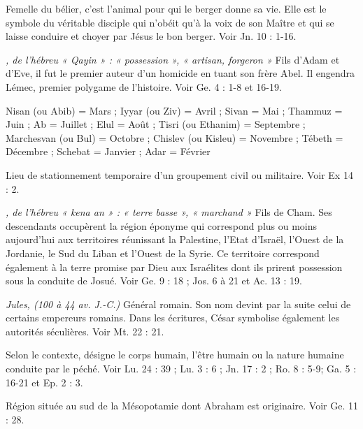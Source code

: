\begin{multicols}{2}
\textit{}\newline
Femelle du bélier, c’est l'animal pour qui le berger donne sa vie. Elle est le symbole du véritable disciple qui n’obéit qu’à la voix de son Maître et qui se laisse conduire et choyer par Jésus le bon berger. Voir Jn. 10 : 1-16.

\textit{, de l'hébreu « Qayin » : « possession », « artisan, forgeron »}\newline
Fils d'Adam et d'Eve, il fut le premier auteur d’un homicide en tuant son frère Abel. Il engendra Lémec, premier polygame de l'histoire. Voir Ge. 4 : 1-8 et 16-19.

\textit{}\newline
Nisan (ou Abib) = Mars ; Iyyar (ou Ziv) = Avril ; Sivan = Mai ; Thammuz = Juin ; Ab = Juillet ; Elul = Août ; Tisri (ou Ethanim) = Septembre ; Marchesvan (ou Bul) = Octobre ; Chislev (ou Kisleu) = Novembre ; Tébeth = Décembre ; Schebat = Janvier ; Adar = Février

\textit{}\newline
Lieu de stationnement temporaire d’un groupement civil ou militaire. Voir Ex 14 : 2.

\textit{, de l'hébreu « kena an » : « terre basse », « marchand »}\newline
Fils de Cham. Ses descendants occupèrent la région éponyme qui correspond plus ou moins aujourd'hui aux territoires réunissant la Palestine, l'Etat d'Israël, l'Ouest de la Jordanie, le Sud du Liban et l'Ouest de la Syrie. Ce territoire correspond également à la terre promise par Dieu aux Israélites dont ils prirent possession sous la conduite de Josué. Voir Ge. 9 : 18 ; Jos. 6 à 21 et Ac. 13 : 19.

\textit{Jules, (100 à 44 av. J.-C.)}\newline
Général romain. Son nom devint par la suite celui de certains empereurs romains. Dans les écritures, César symbolise également les autorités séculières. Voir Mt. 22 : 21.

\textit{}\newline
Selon le contexte, désigne le corps humain, l'être humain ou la nature humaine conduite par le péché. Voir Lu. 24 : 39 ; Lu. 3 : 6 ; Jn. 17 : 2 ; Ro. 8 : 5-9; Ga. 5 : 16-21 et Ep. 2 : 3.

\textit{}\newline
Région située au sud de la Mésopotamie dont Abraham est originaire. Voir Ge. 11 : 28.


\end{multicols}
